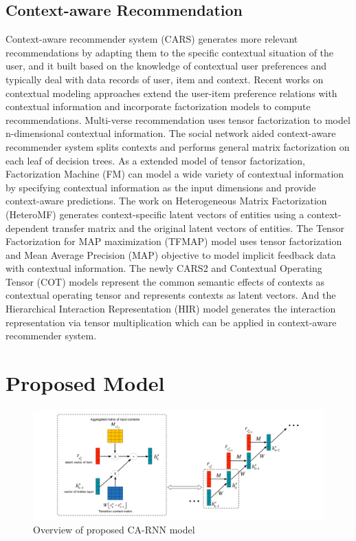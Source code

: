 \documentclass[conference]{IEEEtran}
\begin{document}
\subsection{Context-aware Recommendation}
Context-aware recommender system (CARS) \cite{adomavicius2011context} generates more relevant recommendations by adapting them to the specific contextual situation of the user, and it built based on the knowledge of contextual user preferences and typically deal with data records of user, item and context. Recent works on contextual modeling approaches extend the user-item preference relations with contextual information and incorporate factorization models to compute recommendations. Multi-verse recommendation \cite{karatzoglou2010multiverse} uses tensor factorization to model n-dimensional contextual information. The social network aided context-aware recommender system \cite{liu2013soco} splits contexts and performs general matrix factorization on each leaf of decision trees. As a extended model of tensor factorization, Factorization Machine (FM) \cite{rendle2011fast} can model a wide variety of contextual information by specifying contextual information as the input dimensions and provide context-aware predictions. The work on Heterogeneous Matrix Factorization (HeteroMF) \cite{jamali2013heteromf} generates context-specific latent vectors of entities using a context-dependent transfer matrix and the original latent vectors of entities. The Tensor Factorization for MAP maximization (TFMAP) model \cite{shi2012tfmap} uses tensor factorization and Mean Average Precision (MAP) objective to model implicit feedback data with contextual information. The newly CARS2 \cite{shi2014cars} and Contextual Operating Tensor (COT) \cite{liu2015cot} models represent the common semantic effects of contexts as contextual operating tensor and represents contexts as latent vectors. And the Hierarchical Interaction Representation (HIR) model \cite{liu2015collaborative} generates the interaction representation via tensor multiplication which can be applied in context-aware recommender system.

\section{Proposed Model}
\begin{figure}[htb]
\centering
\includegraphics[width=1\linewidth]{./model.pdf}
\caption{Overview of proposed CA-RNN model}
\label{fig:Model-overview}
\end{figure}
\end{document}
